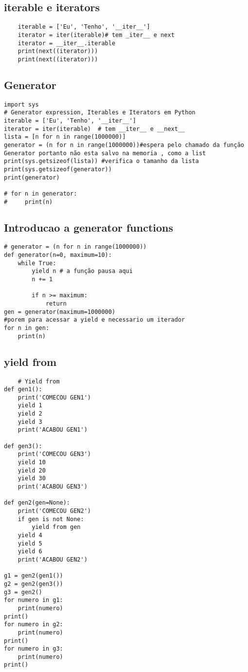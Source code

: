 \documentclass{article}
\begin{document}
\subsection{iterable e iterators}
\begin{lstlisting}
    iterable = ['Eu', 'Tenho', '__iter__']
    iterator = iter(iterable)# tem _iter__ e next
    iterator = __iter__.iterable
    print(next((iterator)))
    print(next((iterator)))
\end{lstlisting}
\subsection{Generator}
\begin{lstlisting}
import sys
# Generator expression, Iterables e Iterators em Python
iterable = ['Eu', 'Tenho', '__iter__']
iterator = iter(iterable)  # tem __iter__ e __next__
lista = [n for n in range(1000000)]
generator = (n for n in range(1000000))#espera pelo chamado da função Generator portanto não esta salvo na memoria , como a list
print(sys.getsizeof(lista)) #verifica o tamanho da lista
print(sys.getsizeof(generator))
print(generator)

# for n in generator:
#     print(n)
\end{lstlisting}
\subsection{Introducao a generator functions}
\begin{lstlisting}
# generator = (n for n in range(1000000))
def generator(n=0, maximum=10):
    while True:
        yield n # a função pausa aqui
        n += 1

        if n >= maximum:
            return
gen = generator(maximum=1000000)
#porem para acessar a yield e necessario um iterador 
for n in gen:
    print(n)
\end{lstlisting}
\subsection{yield from}
\begin{lstlisting}
    # Yield from
def gen1():
    print('COMECOU GEN1')
    yield 1
    yield 2
    yield 3
    print('ACABOU GEN1')

def gen3():
    print('COMECOU GEN3')
    yield 10
    yield 20
    yield 30
    print('ACABOU GEN3')

def gen2(gen=None):
    print('COMECOU GEN2')
    if gen is not None:
        yield from gen
    yield 4
    yield 5
    yield 6
    print('ACABOU GEN2')

g1 = gen2(gen1())
g2 = gen2(gen3())
g3 = gen2()
for numero in g1:
    print(numero)
print()
for numero in g2:
    print(numero)
print()
for numero in g3:
    print(numero)
print()
\end{lstlisting}
\end{document}
